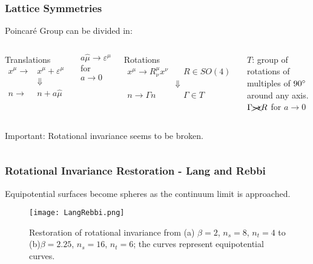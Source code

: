 \documentclass{beamer}
\begin{document}
\begin{frame}
  \frametitle{Lattice Symmetries}
  \centering
{}
  Poincaré Group can be divided in:
  \begin{columns}[t]
    \centering
    \begin{exampleblock}{\centering Translations}
      \vspace{-\baselineskip}
      \begin{align*}
        x^\mu \rightarrow& x^\mu+\varepsilon^\mu \\
        &\Downarrow \\
        n \rightarrow& n+a\hat\mu
      \end{align*}
    \end{exampleblock}
    \vspace{2.5\baselineskip}
    $a\hat\mu \rightarrow \varepsilon^\mu$ for $a\rightarrow0$
  
    \centering
{}
    \begin{exampleblock}{\centering Rotations}
      \vspace{-\baselineskip}
      \begin{align*}
        x^\mu \rightarrow R^\mu_\nu x^\nu &\quad R\in SO(4) \\
        &\Downarrow \\
        n \rightarrow \Gamma n &\quad \Gamma\in T
      \end{align*}
    \end{exampleblock}
    $T$: group of rotations of multiples of $90^\circ$ around any axis.\\
    \vspace{0.6\baselineskip}
    $\Gamma \xcancel{\rightarrow}R$ for $a\rightarrow0$
  \end{columns}
  \vspace{\baselineskip}
  \begin{columns}
    \begin{alertblock}{Important:}
      Rotational invariance seems to be broken.
    \end{alertblock}
  \end{columns}
\end{frame}

\begin{frame}
  \frametitle{Rotational Invariance Restoration - Lang and Rebbi}
  Equipotential surfaces become spheres as the continuum limit is approached.
  \begin{figure}
    \texttt{[image: LangRebbi.png]}
    \caption{Restoration of rotational invariance from (a) $\beta=2$, $n_s=8$, $n_t=4$ to (b)$\beta=2.25$, $n_s=16$, $n_t=6$; the curves represent equipotential curves. \cite{Lang:1982tj}}
  \end{figure}
\end{frame}
\end{document}
